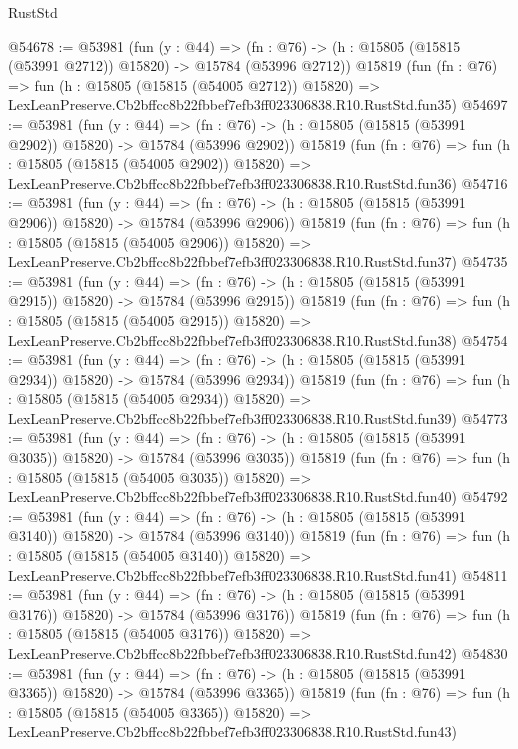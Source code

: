 \begin{lexlean}{RustStd}
\begin{coremodule}
@54678 := @53981
    (fun (y : @44) =>
    (fn : @76) -> (h : @15805 (@15815 (@53991 @2712)) @15820) -> @15784 (@53996 @2712))
    @15819
    (fun (fn : @76) =>
    fun (h : @15805 (@15815 (@54005 @2712)) @15820) =>
    LexLeanPreserve.Cb2bffcc8b22fbbef7efb3ff023306838.R10.RustStd.fun35)
@54697 := @53981
    (fun (y : @44) =>
    (fn : @76) -> (h : @15805 (@15815 (@53991 @2902)) @15820) -> @15784 (@53996 @2902))
    @15819
    (fun (fn : @76) =>
    fun (h : @15805 (@15815 (@54005 @2902)) @15820) =>
    LexLeanPreserve.Cb2bffcc8b22fbbef7efb3ff023306838.R10.RustStd.fun36)
@54716 := @53981
    (fun (y : @44) =>
    (fn : @76) -> (h : @15805 (@15815 (@53991 @2906)) @15820) -> @15784 (@53996 @2906))
    @15819
    (fun (fn : @76) =>
    fun (h : @15805 (@15815 (@54005 @2906)) @15820) =>
    LexLeanPreserve.Cb2bffcc8b22fbbef7efb3ff023306838.R10.RustStd.fun37)
@54735 := @53981
    (fun (y : @44) =>
    (fn : @76) -> (h : @15805 (@15815 (@53991 @2915)) @15820) -> @15784 (@53996 @2915))
    @15819
    (fun (fn : @76) =>
    fun (h : @15805 (@15815 (@54005 @2915)) @15820) =>
    LexLeanPreserve.Cb2bffcc8b22fbbef7efb3ff023306838.R10.RustStd.fun38)
@54754 := @53981
    (fun (y : @44) =>
    (fn : @76) -> (h : @15805 (@15815 (@53991 @2934)) @15820) -> @15784 (@53996 @2934))
    @15819
    (fun (fn : @76) =>
    fun (h : @15805 (@15815 (@54005 @2934)) @15820) =>
    LexLeanPreserve.Cb2bffcc8b22fbbef7efb3ff023306838.R10.RustStd.fun39)
@54773 := @53981
    (fun (y : @44) =>
    (fn : @76) -> (h : @15805 (@15815 (@53991 @3035)) @15820) -> @15784 (@53996 @3035))
    @15819
    (fun (fn : @76) =>
    fun (h : @15805 (@15815 (@54005 @3035)) @15820) =>
    LexLeanPreserve.Cb2bffcc8b22fbbef7efb3ff023306838.R10.RustStd.fun40)
@54792 := @53981
    (fun (y : @44) =>
    (fn : @76) -> (h : @15805 (@15815 (@53991 @3140)) @15820) -> @15784 (@53996 @3140))
    @15819
    (fun (fn : @76) =>
    fun (h : @15805 (@15815 (@54005 @3140)) @15820) =>
    LexLeanPreserve.Cb2bffcc8b22fbbef7efb3ff023306838.R10.RustStd.fun41)
@54811 := @53981
    (fun (y : @44) =>
    (fn : @76) -> (h : @15805 (@15815 (@53991 @3176)) @15820) -> @15784 (@53996 @3176))
    @15819
    (fun (fn : @76) =>
    fun (h : @15805 (@15815 (@54005 @3176)) @15820) =>
    LexLeanPreserve.Cb2bffcc8b22fbbef7efb3ff023306838.R10.RustStd.fun42)
@54830 := @53981
    (fun (y : @44) =>
    (fn : @76) -> (h : @15805 (@15815 (@53991 @3365)) @15820) -> @15784 (@53996 @3365))
    @15819
    (fun (fn : @76) =>
    fun (h : @15805 (@15815 (@54005 @3365)) @15820) =>
    LexLeanPreserve.Cb2bffcc8b22fbbef7efb3ff023306838.R10.RustStd.fun43)

\end{coremodule}
\end{lexlean}
